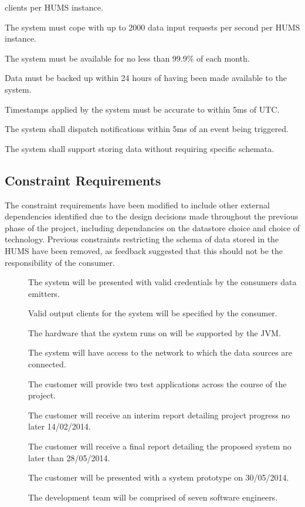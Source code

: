 \begin{description}
	clients per HUMS instance. 
	\item[\nfr{9}]  The system must cope with up to 2000 data input 
	requests per second per HUMS instance. 
	\item[\nfr{10}] The system must be available for no less than 99.9\% of 
	each month.
	\item[\nfr{11}]  Data must be backed up within 24 hours of having been 
	made available to the system.
	 \item[\nfr{12}] Timestamps applied by the system must be accurate to 
	within 5ms of UTC.
	\item[\nfr{13}]  The system shall dispatch notifications within 5ms of an 
	event being triggered.
	\item[\nfr{14}] The system shall support storing data without requiring 
	specific schemata.
\end{description}

\subsection{Constraint Requirements}
The constraint requirements have been modified to include other external dependencies identified due to the design decisions made throughout the previous phase of the project, including dependancies on the datastore choice and choice of technology. Previous constraints restricting the schema of data stored in the HUMS have been removed, as feedback suggested that this should not be the responsibility of the consumer.
\begin{description}
	\item[]  The system will be presented with valid credentials 	by the consumers data emitters.
	\item[]  Valid output clients for the system will be specified 		by the consumer.	
	\item[]  The hardware that the system runs on will be 			supported by the JVM.
	\item[]  The system will have access to the network to which 	the data sources are connected.
	\item[]  The customer will provide two test applications 		across the course of the project.
	\item[]  The customer will receive an interim report detailing 	project progress no later 14/02/2014.
	\item[] The customer will receive a final report detailing the 	proposed system no later than 28/05/2014. 
	\item[]  The customer will be presented with a system 		prototype on 30/05/2014.
	\item[] The development team will be comprised of seven 		software engineers.
\end{description}

